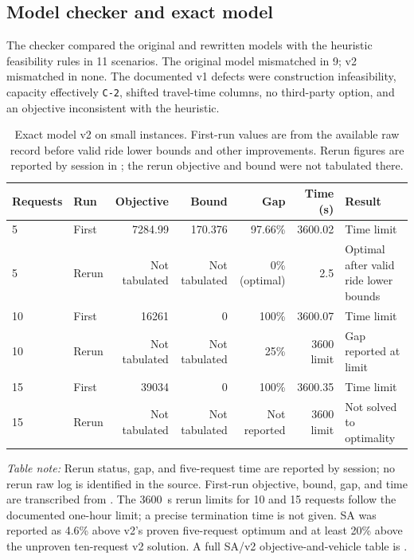 \subsection{Model checker and exact model}

The checker compared the original and rewritten models with the heuristic
feasibility rules in 11 scenarios. The original model mismatched in 9; v2
mismatched in none. The documented v1 defects were construction infeasibility,
capacity effectively \texttt{C-2}, shifted travel-time columns, no third-party
option, and an objective inconsistent with the heuristic.

\begin{table}[H]
\centering
\small
\caption{Exact model v2 on small instances. First-run values are from the
available raw record before valid ride lower bounds and other improvements.
Rerun figures are reported by session in ;
the rerun objective and bound were not tabulated there.}
\begin{tabularx}{\linewidth}{@{}l l r r r r X@{}}
\toprule
Requests & Run & Objective & Bound & Gap & Time (s) & Result\\
\midrule
5 & First & 7284.99 & 170.376 & 97.66\% & 3600.02 & Time limit\\
5 & Rerun & Not tabulated & Not tabulated & 0\% (optimal) & 2.5 & Optimal after valid ride lower bounds\\
10 & First & 16261 & 0 & 100\% & 3600.07 & Time limit\\
10 & Rerun & Not tabulated & Not tabulated & 25\% & 3600 limit & Gap reported at limit\\
15 & First & 39034 & 0 & 100\% & 3600.35 & Time limit\\
15 & Rerun & Not tabulated & Not tabulated & Not reported & 3600 limit & Not solved to optimality\\
\bottomrule
\end{tabularx}
\end{table}

\noindent\textit{Table note:} Rerun status, gap, and five-request time are
reported by session; no rerun raw log is identified in the source. First-run
objective, bound, gap, and time are transcribed from
. The \SI{3600}{s} rerun limits
for 10 and 15 requests follow the documented one-hour limit; a precise
termination time is not given. SA was reported as 4.6\% above v2's proven
five-request optimum and at least 20\% above the unproven ten-request v2
solution. A full SA/v2 objective-and-vehicle table is \tagopen[A5].


